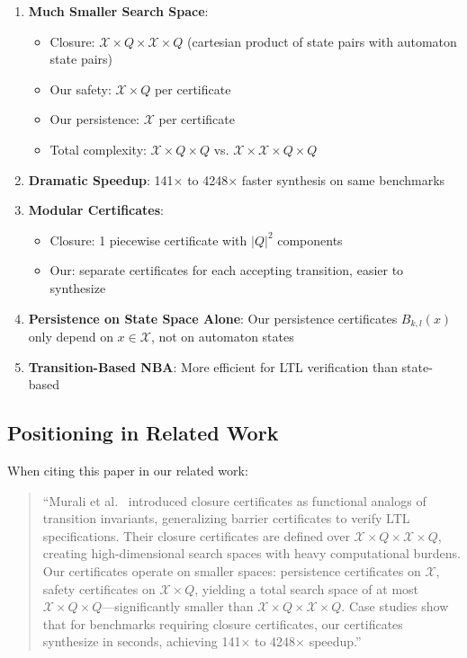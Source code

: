 \documentclass{article}
\begin{document}
\begin{enumerate}
    \item \textbf{Much Smaller Search Space}:
    \begin{itemize}
        \item Closure: $\mathcal{X} \times Q \times \mathcal{X} \times Q$ (cartesian product of state pairs with automaton state pairs)
        \item Our safety: $\mathcal{X} \times Q$ per certificate
        \item Our persistence: $\mathcal{X}$ per certificate
        \item Total complexity: $\mathcal{X} \times Q \times Q$ vs. $\mathcal{X} \times \mathcal{X} \times Q \times Q$
    \end{itemize}

    \item \textbf{Dramatic Speedup}: 141× to 4248× faster synthesis on same benchmarks

    \item \textbf{Modular Certificates}:
    \begin{itemize}
        \item Closure: 1 piecewise certificate with $|Q|^2$ components
        \item Our: separate certificates for each accepting transition, easier to synthesize
    \end{itemize}

    \item \textbf{Persistence on State Space Alone}: Our persistence certificates $B_{k,l}(x)$ only depend on $x \in \mathcal{X}$, not on automaton states

    \item \textbf{Transition-Based NBA}: More efficient for LTL verification than state-based
\end{enumerate}

\subsection{Positioning in Related Work}

When citing this paper in our related work:

\begin{quote}
``Murali et al.~\cite{murali2024closure} introduced closure certificates as functional analogs of transition invariants, generalizing barrier certificates to verify LTL specifications. Their closure certificates are defined over $\mathcal{X} \times Q \times \mathcal{X} \times Q$, creating high-dimensional search spaces with heavy computational burdens. Our certificates operate on smaller spaces: persistence certificates on $\mathcal{X}$, safety certificates on $\mathcal{X} \times Q$, yielding a total search space of at most $\mathcal{X} \times Q \times Q$—significantly smaller than $\mathcal{X} \times Q \times \mathcal{X} \times Q$. Case studies show that for benchmarks requiring closure certificates, our certificates synthesize in seconds, achieving 141× to 4248× speedup.''
\end{quote}
\end{document}
